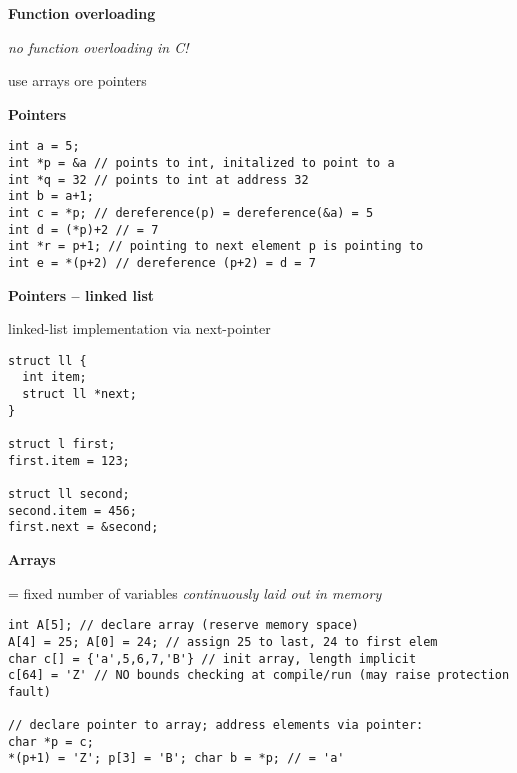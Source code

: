 \textbf{Function overloading}
\begin{items}
  \item \emph{no function overloading in C!}
  \item use arrays ore pointers
\end{items}

\textbf{Pointers}
\begin{lstlisting}[style=customc]
int a = 5;
int *p = &a // points to int, initalized to point to a
int *q = 32 // points to int at address 32
int b = a+1;
int c = *p; // dereference(p) = dereference(&a) = 5
int d = (*p)+2 // = 7
int *r = p+1; // pointing to next element p is pointing to
int e = *(p+2) // dereference (p+2) = d = 7
\end{lstlisting}

\textbf{Pointers -- linked list}
\begin{items}
  \item linked-list implementation via next-pointer
\end{items}
\begin{lstlisting}[style=customc]
struct ll {
  int item;
  struct ll *next;
}

struct l first;
first.item = 123;

struct ll second;
second.item = 456;
first.next = &second;
\end{lstlisting}

\newpage

\textbf{Arrays}
\begin{items}
  \item = fixed number of variables \emph{continuously laid out in memory}
\end{items}
\begin{lstlisting}[style=customc]
int A[5]; // declare array (reserve memory space)
A[4] = 25; A[0] = 24; // assign 25 to last, 24 to first elem
char c[] = {'a',5,6,7,'B'} // init array, length implicit
c[64] = 'Z' // NO bounds checking at compile/run (may raise protection fault)

// declare pointer to array; address elements via pointer:
char *p = c;
*(p+1) = 'Z'; p[3] = 'B'; char b = *p; // = 'a'
\end{lstlisting}